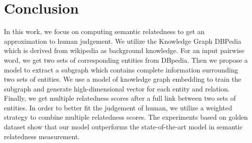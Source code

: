 \section{Conclusion}
In this work, we focus on computing semantic relatedness to get an approximation to human judgement.
We utilize the Knowledge Graph DBPedia which is derived from wikipedia as background knowledge.
For an input pairwise word, we get two sets of corresponding entities from DBpedia.
Then we propose a model to extract a subgraph which contains complete information surrounding two sets of entities.
We use a model of knowledge graph embedding to train the subgraph and generate high-dimensional vector for each entity and relation. 
Finally, we get multiple relatedness scores after a full link between two sets of entities.
In order to better fit the judgement of human, we utilize a weighted strategy to combine
multiple relatedness scores. The experiments based on golden dataset show that our model
outperforms the state-of-the-art model in semantic relatedness measurement.